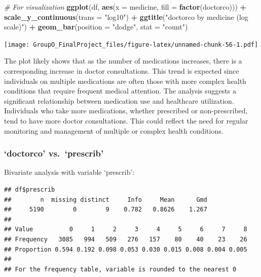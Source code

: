 \documentclass[
]{article}
\newenvironment{Shaded}{\begin{snugshade}}{\end{snugshade}}
\newcommand{\AttributeTok}[1]{\textcolor[rgb]{0.13,0.29,0.53}{#1}}
\newcommand{\CommentTok}[1]{\textcolor[rgb]{0.56,0.35,0.01}{\textit{#1}}}
\newcommand{\FunctionTok}[1]{\textcolor[rgb]{0.13,0.29,0.53}{\textbf{#1}}}
\newcommand{\NormalTok}[1]{#1}
\newcommand{\SpecialCharTok}[1]{\textcolor[rgb]{0.81,0.36,0.00}{\textbf{#1}}}
\newcommand{\StringTok}[1]{\textcolor[rgb]{0.31,0.60,0.02}{#1}}
\begin{document}
\begin{Shaded}
\begin{Highlighting}[]
\CommentTok{\# For visualization}
\FunctionTok{ggplot}\NormalTok{(df, }\FunctionTok{aes}\NormalTok{(}\AttributeTok{x =}\NormalTok{ medicine, }\AttributeTok{fill =} \FunctionTok{factor}\NormalTok{(doctorco))) }\SpecialCharTok{+} 
  \FunctionTok{scale\_y\_continuous}\NormalTok{(}\AttributeTok{trans =} \StringTok{"log10"}\NormalTok{) }\SpecialCharTok{+}
  \FunctionTok{ggtitle}\NormalTok{(}\StringTok{"\textquotesingle{}doctorco\textquotesingle{} by \textquotesingle{}medicine\textquotesingle{} (log scale)"}\NormalTok{) }\SpecialCharTok{+}
  \FunctionTok{geom\_bar}\NormalTok{(}\AttributeTok{position =} \StringTok{"dodge"}\NormalTok{, }\AttributeTok{stat =} \StringTok{"count"}\NormalTok{)}
\end{Highlighting}
\end{Shaded}

\texttt{[image: GroupO\_FinalProject\_files/figure-latex/unnamed-chunk-56-1.pdf]}

The plot likely shows that as the number of medications increases, there
is a corresponding increase in doctor consultations. This trend is
expected since individuals on multiple medications are often those with
more complex health conditions that require frequent medical attention.
The analysis suggests a significant relationship between medication use
and healthcare utilization. Individuals who take more medications,
whether prescribed or non-prescribed, tend to have more doctor
consultations. This could reflect the need for regular monitoring and
management of multiple or complex health conditions.

\subsubsection{`doctorco' vs.~`prescrib'}\label{doctorco-vs.-prescrib}

Bivariate analysis with variable `prescrib':

\begin{Shaded}
\end{Shaded}

\begin{verbatim}
## df$prescrib 
##        n  missing distinct     Info     Mean      Gmd 
##     5190        0        9    0.782   0.8626    1.267 
##                                                                 
## Value          0     1     2     3     4     5     6     7     8
## Frequency   3085   994   509   276   157    80    40    23    26
## Proportion 0.594 0.192 0.098 0.053 0.030 0.015 0.008 0.004 0.005
## 
## For the frequency table, variable is rounded to the nearest 0
\end{verbatim}
\end{document}
